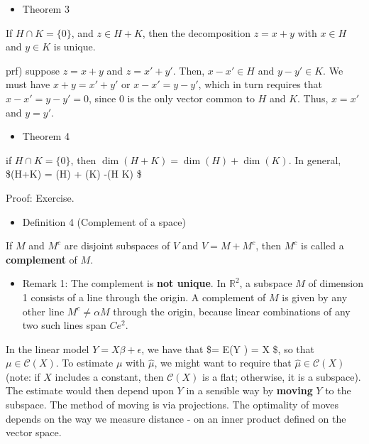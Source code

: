 \documentclass[
]{book}
\providecommand{\tightlist}{%
  \setlength{\itemsep}{0pt}\setlength{\parskip}{0pt}}
\begin{document}
{{{\begin{itemize}
\tightlist
\item
  Theorem 3
\end{itemize}

If \(H \cap K = \big \{ 0 \big \}\), and \(z \in H +K\), then the decomposition \(z = x+y\) with \(x \in H\) and \(y \in K\) is unique.

prf) suppose \(z=x+y\) and \(z=x' + y'\). Then, \(x-x' \in H\) and \(y-y' \in K\). We must have \(x+y = x' + y'\) or \(x-x'=y-y'\), which in turn requires that \(x-x' = y-y' = 0\), since \(0\) is the only vector common to \(H\) and \(K\). Thus, \(x=x'\) and \(y=y'\).

\begin{itemize}
\tightlist
\item
  Theorem 4
\end{itemize}

if \(H \cap K = \big \{ 0 \big \}\), then \(\dim(H+K) = \dim(H) + \dim(K)\). In general, \$\dim(H+K) = \dim(H) + \dim(K) -\dim(H \cap K) \$

Proof: Exercise.

\begin{itemize}
\tightlist
\item
  Definition 4 (Complement of a space)
\end{itemize}

If \(M\) and \(M^c\) are disjoint subspaces of \(V\) and \(V = M +M^c\), then \(M^c\) is called a \textbf{complement} of \(M\).

\begin{itemize}
\tightlist
\item
  Remark 1: The complement is \textbf{not unique}. In \(\mathbb{R}^2\), a subspace \(M\) of dimension 1 consists of a line through the origin. A complement of \(M\) is given by any other line \(M^c \not = \alpha M\) through the origin, because linear combinations of any two such lines span \(Ce^2\).
\end{itemize}

In the linear model \(Y = X \beta + \epsilon\), we have that \$\mu= E(Y ) = X \beta \$, so that \(\mu \in \mathcal{C}(X)\). To estimate \(\mu\) with \(\hat \mu\), we might want to require that \(\hat \mu \in \mathcal{C}(X)\) (note: if \(X\) includes a constant, then \(\mathcal{C}(X)\) is a flat; otherwise, it is a subspace). The estimate would then depend upon \(Y\) in a sensible way by \textbf{moving} \(Y\) to the subspace. The method of moving is via projections. The optimality of moves depends on the way we measure distance - on an inner product defined on the vector space.

}}}
\end{document}
